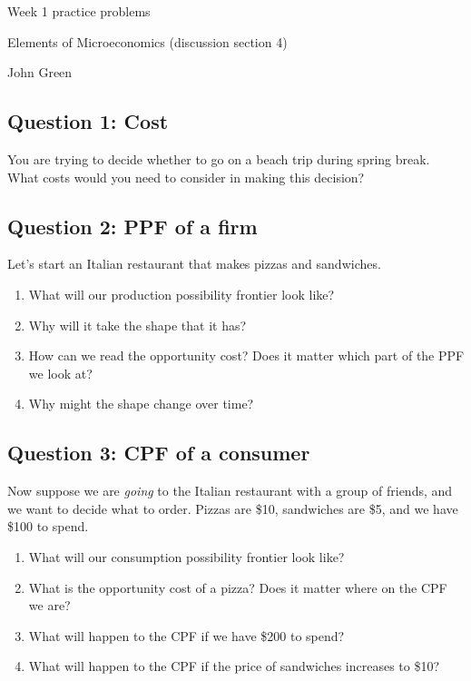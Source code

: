 \documentclass[12pt]{article}
\begin{document}
\begin{center}
\Large Week 1 practice problems

\medskip

\normalsize Elements of Microeconomics (discussion section 4)

\medskip

\small John Green
\end{center}

\medskip

\subsection*{Question 1: Cost}
You are trying to decide whether to go on a beach trip during spring break. What costs would you need to consider in making this decision?

\subsection*{Question 2: PPF of a firm}
Let's start an Italian restaurant that makes pizzas and sandwiches.
\begin{enumerate}
    \item What will our production possibility frontier look like?
    \item Why will it take the shape that it has?
    \item How can we read the opportunity cost? Does it matter which part of the PPF we look at?
    \item Why might the shape change over time?
\end{enumerate}

\subsection*{Question 3: CPF of a consumer}
Now suppose we are \textit{going} to the Italian restaurant with a group of friends, and we want to decide what to order. Pizzas are \$10, sandwiches are \$5, and we have \$100 to spend.
    \begin{enumerate}
        \item What will our consumption possibility frontier look like?
        \item What is the opportunity cost of a pizza? Does it matter where on the CPF we are?
        \item What will happen to the CPF if we have \$200 to spend?
        \item What will happen to the CPF if the price of sandwiches increases to \$10?
    \end{enumerate}
\end{document}
